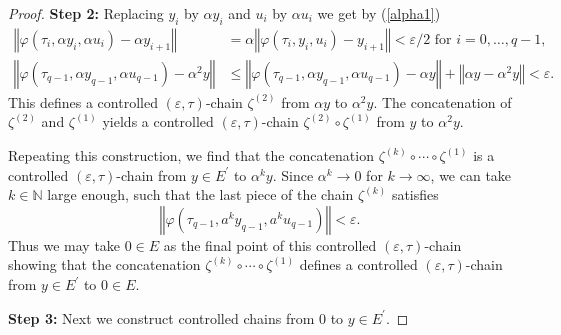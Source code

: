 \documentclass[10pt,a4paper]{amsart}
\begin{document}
\begin{proof}
\textbf{Step 2: }Replacing $y_{i}$ by $\alpha y_{i}$ and $u_{i}$ by $\alpha
u_{i}$ we get by (\ref{alpha1})%
\begin{align*}
\left\Vert \varphi(\tau_{i},\alpha y_{i},\alpha u_{i})-\alpha y_{i+1}%
\right\Vert  &  =\alpha\left\Vert \varphi(\tau_{i},y_{i},u_{i})-y_{i+1}%
\right\Vert <\varepsilon/2\text{ for }i=0,\ldots,q-1,\\
\left\Vert \varphi(\tau_{q-1},\alpha y_{q-1},\alpha u_{q-1})-\alpha
^{2}y\right\Vert  &  \leq\left\Vert \varphi(\tau_{q-1},\alpha y_{q-1},\alpha
u_{q-1})-\alpha y\right\Vert +\left\Vert \alpha y-\alpha^{2}y\right\Vert
<\varepsilon.
\end{align*}
This defines a controlled $(\varepsilon,\tau)$-chain $\zeta^{(2)}$ from
$\alpha y$ to $\alpha^{2}y$. The concatenation of $\zeta^{(2)}$ and
$\zeta^{(1)}$ yields a controlled $(\varepsilon,\tau)$-chain $\zeta^{(2)}%
\circ\zeta^{(1)}$ from $y$ to $\alpha^{2}y$.

Repeating this construction, we find that the concatenation $\zeta^{(k)}%
\circ\cdots\circ\zeta^{(1)}$ is a controlled $(\varepsilon,\tau)$-chain from
$y\in E^{\prime}$ to $\alpha^{k}y$. Since $\alpha^{k}\rightarrow0$ for
$k\rightarrow\infty$, we can take $k\in\mathbb{N}$ large enough, such that the
last piece of the chain $\zeta^{(k)}$ satisfies%
\[
\left\Vert \varphi(\tau_{q-1},a^{k}y_{q-1},a^{k}u_{q-1})\right\Vert
<\varepsilon.
\]
Thus we may take $0\in E$ as the final point of this controlled $(\varepsilon
,\tau)$-chain showing that the concatenation $\zeta^{(k)}\circ\cdots\circ
\zeta^{(1)}$ defines a controlled $(\varepsilon,\tau)$-chain from $y\in
E^{\prime}$ to $0\in E$.

\textbf{Step 3:} Next we construct controlled chains from $0$ to $y\in
E^{\prime}$.


\end{proof}
\end{document}
